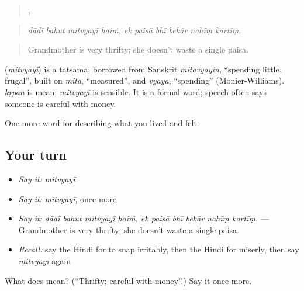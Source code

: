 \begin{quote}
   ,      
\end{quote}

\begin{quote}
\emph{dādī bahut mitvyayī haiṁ, ek paisā bhī bekār nahīṃ kartīṃ.}
\end{quote}

\begin{quote}
Grandmother is very thrifty; she doesn't waste a single paisa.
\end{quote}

\begin{cousinweb}
\textbf{} (\emph{mitvyayī}) is a tatsama, borrowed from Sanskrit \emph{mitavyayin}, \textquotedblleft{}spending little, frugal\textquotedblright{}, built on \emph{mita}, \textquotedblleft{}measured\textquotedblright{}, and \emph{vyaya}, \textquotedblleft{}spending\textquotedblright{} (Monier-Williams). \emph{kṛpaṇ} is mean; \emph{mitvyayī} is sensible. It is a formal word; speech often says someone is careful with money.
\end{cousinweb}

\begin{grammarlens}[title={What you've built}]
One more word for describing what you lived and felt.
\end{grammarlens}

\subsection*{Your turn}
\begin{itemize}
\raggedright
  \item \emph{Say it:} \emph{mitvyayī}
  \item \emph{Say it:} \emph{mitvyayī}, once more
  \item \emph{Say it:} \emph{dādī bahut mitvyayī haiṁ, ek paisā bhī bekār nahīṃ kartīṃ.} — Grandmother is very thrifty; she doesn't waste a single paisa.
  \item \emph{Recall:} say the Hindi for to snap irritably, then the Hindi for miserly, then say \emph{mitvyayī} again
\end{itemize}

\begin{tcolorbox}[breakable,colback=teal!4,colframe=teal!35!black,title={Before you move on}]
What does  mean? (\textquotedblleft{}Thrifty; careful with money\textquotedblright{}.) Say it once more.
\end{tcolorbox}
